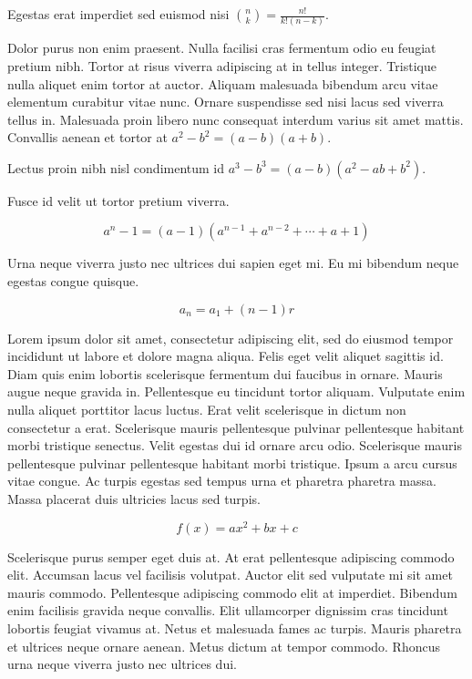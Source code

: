 \documentclass{article}
\begin{document}
	
    Egestas erat imperdiet sed euismod nisi 
    \begin{math}
    {n \choose k}=\frac{n!}{k!(n-k)}
    \end{math}.
    \newline
    
    Dolor purus non enim praesent. Nulla facilisi cras fermentum odio eu feugiat pretium nibh. Tortor at risus viverra adipiscing at in tellus integer. Tristique nulla aliquet enim tortor at auctor. Aliquam malesuada bibendum arcu vitae elementum curabitur vitae nunc. Ornare suspendisse sed nisi lacus sed viverra tellus in. Malesuada proin libero nunc consequat interdum varius sit amet mattis. Convallis aenean et tortor at $ a^2-b^2=(a-b)(a+b) $.
    \newline
    
    Lectus proin nibh nisl condimentum id \( a^3-b^3=(a-b)(a^2-ab+b^2) \).
    \newline
    
    Fusce id velit ut tortor pretium viverra.
    
    \[ a^n-1=(a-1)(a^{n-1}+a^{n-2}+\cdots+a+1) \]
    
    Urna neque viverra justo nec ultrices dui sapien eget mi. Eu mi bibendum neque egestas congue quisque.
    
    $$ a_n=a_1+(n-1)r $$
    
    Lorem ipsum dolor sit amet, consectetur adipiscing elit, sed do eiusmod tempor incididunt ut labore et dolore magna aliqua. Felis eget velit aliquet sagittis id. Diam quis enim lobortis scelerisque fermentum dui faucibus in ornare. Mauris augue neque gravida in. Pellentesque eu tincidunt tortor aliquam. Vulputate enim nulla aliquet porttitor lacus luctus. Erat velit scelerisque in dictum non consectetur a erat. Scelerisque mauris pellentesque pulvinar pellentesque habitant morbi tristique senectus. Velit egestas dui id ornare arcu odio. Scelerisque mauris pellentesque pulvinar pellentesque habitant morbi tristique. Ipsum a arcu cursus vitae congue. Ac turpis egestas sed tempus urna et pharetra pharetra massa. Massa placerat duis ultricies lacus sed turpis.
    
    \begin{displaymath}
    	f(x)=ax^2+bx+c
    \end{displaymath}
    
   Scelerisque purus semper eget duis at. At erat pellentesque adipiscing commodo elit. Accumsan lacus vel facilisis volutpat. Auctor elit sed vulputate mi sit amet mauris commodo. Pellentesque adipiscing commodo elit at imperdiet. Bibendum enim facilisis gravida neque convallis. Elit ullamcorper dignissim cras tincidunt lobortis feugiat vivamus at. Netus et malesuada fames ac turpis. Mauris pharetra et ultrices neque ornare aenean. Metus dictum at tempor commodo. Rhoncus urna neque viverra justo nec ultrices dui.
    
\end{document}
